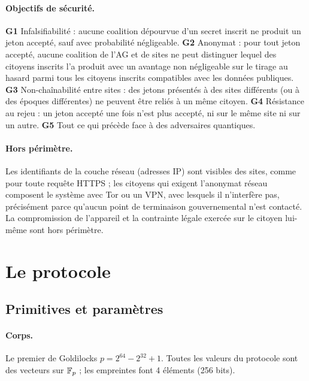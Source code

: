 \documentclass[11pt]{article}
\theoremstyle{definition}
\begin{document}
\paragraph{Objectifs de sécurité.}
\textbf{G1} Infalsifiabilité : aucune coalition dépourvue d'un secret inscrit ne produit
un jeton accepté, sauf avec probabilité négligeable.
\textbf{G2} Anonymat : pour tout jeton accepté, aucune coalition de l'AG et de sites ne
peut distinguer lequel des citoyens inscrits l'a produit avec un avantage non négligeable
sur le tirage au hasard parmi tous les citoyens inscrits compatibles avec les données
publiques.
\textbf{G3} Non-chaînabilité entre sites : des jetons présentés à des sites différents (ou
à des époques différentes) ne peuvent être reliés à un même citoyen.
\textbf{G4} Résistance au rejeu : un jeton accepté une fois n'est plus accepté, ni sur le
même site ni sur un autre.
\textbf{G5} Tout ce qui précède face à des adversaires quantiques.

\paragraph{Hors périmètre.} Les identifiants de la couche réseau (adresses IP) sont
visibles des sites, comme pour toute requête HTTPS ; les citoyens qui exigent l'anonymat
réseau composent le système avec Tor ou un VPN, avec lesquels il n'interfère pas,
précisément parce qu'aucun point de terminaison gouvernemental n'est contacté. La
compromission de l'appareil et la contrainte légale exercée sur le citoyen lui-même sont
hors périmètre.

\section{Le protocole}
\label{sec:protocol}

\subsection{Primitives et paramètres}
\label{sec:prims}

\paragraph{Corps.} Le premier de Goldilocks $p = 2^{64} - 2^{32} + 1$. Toutes les valeurs
du protocole sont des vecteurs sur $\mathbb{F}_p$ ; les empreintes font 4 éléments (256 bits).
\end{document}
